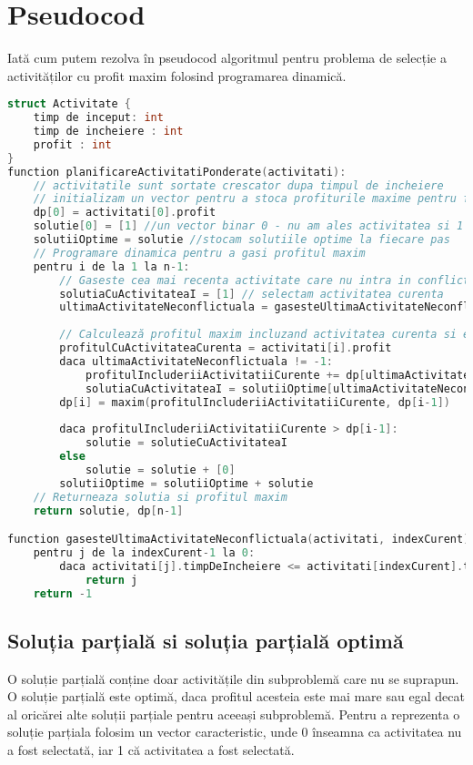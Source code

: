 \section{Pseudocod}
Iată cum putem rezolva în pseudocod algoritmul pentru problema de selecție a activităților cu profit maxim folosind programarea dinamică. 
\begin{lstlisting}[language=C++]
struct Activitate {
    timp de inceput: int
    timp de incheiere : int
    profit : int 
}
function planificareActivitatiPonderate(activitati):
    // activitatile sunt sortate crescator dupa timpul de incheiere
    // initializam un vector pentru a stoca profiturile maxime pentru fiecare activitate, fie dp un vector de dimensiune n, unde n este numarul de activitati
    dp[0] = activitati[0].profit
    solutie[0] = [1] //un vector binar 0 - nu am ales activitatea si 1 - am ales activitatea
    solutiiOptime = solutie //stocam solutiile optime la fiecare pas
    // Programare dinamica pentru a gasi profitul maxim
    pentru i de la 1 la n-1:
        // Gaseste cea mai recenta activitate care nu intra in conflict cu activitatea curenta
        solutiaCuActivitateaI = [1] // selectam activitatea curenta
        ultimaActivitateNeconflictuala = gasesteUltimaActivitateNeconflictuala(activitati, i)
        
        // Calculează profitul maxim incluzand activitatea curenta si excluzand-o
        profitulCuActivitateaCurenta = activitati[i].profit
        daca ultimaActivitateNeconflictuala != -1:
            profitulIncluderiiActivitatiiCurente += dp[ultimaActivitateNeconflictuala]
            solutiaCuActivitateaI = solutiiOptime[ultimaActivitateNeconflictuala] + solutiaCuActivitateaI
        dp[i] = maxim(profitulIncluderiiActivitatiiCurente, dp[i-1])
        
        daca profitulIncluderiiActivitatiiCurente > dp[i-1]:
            solutie = solutieCuActivitateaI
        else
            solutie = solutie + [0]
        solutiiOptime = solutiiOptime + solutie 
    // Returneaza solutia si profitul maxim
    return solutie, dp[n-1]

function gasesteUltimaActivitateNeconflictuala(activitati, indexCurent):
    pentru j de la indexCurent-1 la 0:
        daca activitati[j].timpDeIncheiere <= activitati[indexCurent].timpDeInceput:
            return j
    return -1
\end{lstlisting}

\subsection{Soluția parțială si soluția parțială optimă}
O soluție parțială conține doar activitățile din subproblemă care nu se suprapun. O soluție parțială este optimă, daca profitul acesteia este mai mare sau egal decat al oricărei alte soluții parțiale pentru aceeași subproblemă. Pentru a reprezenta o soluție parțiala folosim un vector caracteristic, unde 0 înseamna ca activitatea nu a fost selectată, iar 1 că activitatea a fost selectată. \\ 

